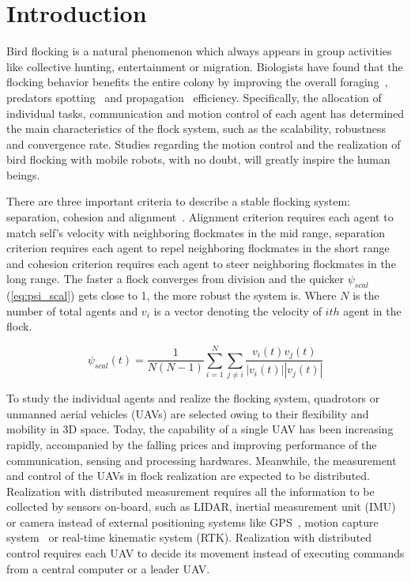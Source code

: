\chapter{Introduction}\label{introduction}

Bird flocking is a natural phenomenon which always appears in group activities like collective hunting, entertainment or migration. Biologists have found that the flocking behavior benefits the entire colony by improving the overall foraging~\cite{Foraging}, predators spotting~\cite{Predator} and propagation~\cite{Propagation} efficiency. Specifically, the allocation of individual tasks, communication and motion control of each agent has determined the main characteristics of the flock system, such as the scalability, robustness and convergence rate. Studies regarding the motion control and the realization of bird flocking with mobile robots, with no doubt, will greatly inspire the human beings.

There are three important criteria to describe a stable flocking system: separation, cohesion and alignment~\cite{Reynolds1987}. Alignment criterion requires each agent to match self's velocity with neighboring flockmates in the mid range, separation criterion requires each agent to repel neighboring flockmates in the short range and cohesion criterion requires each agent to steer neighboring flockmates in the long range. The faster a flock converges from division and the quicker $\psi_{scal}$ (\ref{eq:psi_scal}) gets close to 1, the more robust the system is. Where $N$ is the number of total agents and $v_i$ is a vector denoting the velocity of $ith$ agent in the flock.

\begin{equation}\label{eq:psi_scal}
\psi_{scal}(t)=\frac{1}{N(N-1)}\sum^N_{i=1}\sum_{j\neq i}\frac{v_i(t)v_j(t)}{|v_i(t)||v_j(t)|}
\end{equation}

To study the individual agents and realize the flocking system, quadrotors or unmanned aerial vehicles (UAVs) are selected owing to their flexibility and mobility in 3D space. Today, the capability of a single UAV has been increasing rapidly, accompanied by the falling prices and improving performance of the communication, sensing and processing hardwares. Meanwhile, the measurement and control of the UAVs in flock realization are expected to be distributed. Realization with distributed measurement requires all the information to be collected by sensors on-board, such as LIDAR, inertial measurement unit (IMU) or camera instead of external positioning systems like GPS~\cite{Vicsek2018}, motion capture system~\cite{Swarm2018} or real-time kinematic system (RTK). Realization with distributed control requires each UAV to decide its movement instead of executing commands from a central computer or a leader UAV.

